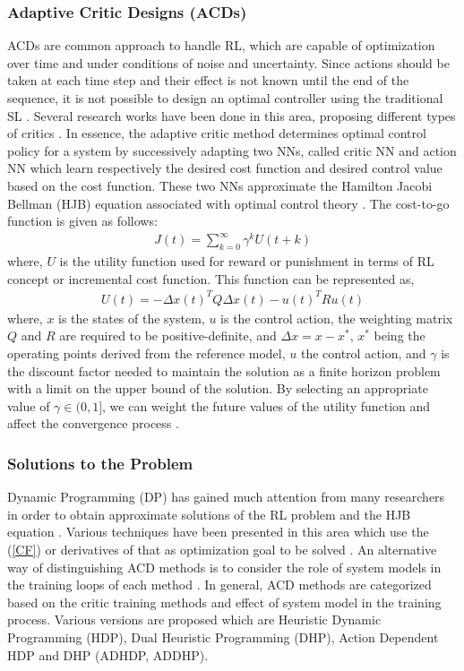 \documentclass[journal]{IEEEtran}
\begin{document}
\subsubsection{Adaptive Critic Designs (ACDs)}
ACDs are common approach to handle RL, which are capable of optimization over time and under conditions of noise and uncertainty. Since actions should be taken at each time step and their effect is not known until the end of the sequence, it is not possible to design an optimal controller using the traditional SL \cite{BlueBook}. Several research works have been done in this area, proposing different types of critics \cite{BlueBook, werbos1992approximate}. In essence, the adaptive critic method determines optimal control policy for a system by successively adapting two NNs, called critic NN and action NN which learn respectively the desired cost function and desired control value based on the cost function. These two NNs approximate the Hamilton Jacobi Bellman (HJB) equation associated with optimal control theory \cite{BlueBook}. The cost-to-go function is given as follows:
\begin{eqnarray}
J(t)=\sum\nolimits_{k=0}^{\infty} \gamma^k U(t+k) \label{CF}
\end{eqnarray}
where, $U$ is the utility function used for reward or punishment in terms of RL concept or incremental cost function. This function can be represented as,
\begin{eqnarray}
U(t)=- \Delta x(t)^T Q \Delta x(t) - u(t)^T R u(t)
\label{U}
\end{eqnarray}
where, $x$ is the states of the system, $u$ is the control action, the weighting matrix $Q$ and $R$ are required to be positive-definite, and $\Delta x=x-x^*$, $x^*$ being the operating points derived from the reference model, $u$ the control action, and $\gamma$ is the discount factor needed to maintain the solution as a finite horizon problem with a limit on the upper bound of the solution. By selecting an appropriate value of $\gamma\in(0, 1]$, we can weight the future values of the utility function and affect the convergence process \cite{Widrow}. 


\subsubsection{Solutions to the Problem}
Dynamic Programming (DP) has gained much attention from many researchers in order to obtain approximate solutions of the RL problem and the HJB equation \cite{Werbos2000a, Wang2009}. Various techniques have been presented in this area which use the (\ref{CF}) or derivatives of that as optimization goal to be solved \cite{WerbosFirst}. An alternative way of distinguishing ACD methods is to consider the role of system models in the training loops of each method \cite{Shannon}. In general, ACD methods are categorized based on the critic training methods and effect of system model in the training process. Various versions are proposed which are Heuristic Dynamic Programming (HDP), Dual Heuristic Programming (DHP), Action Dependent HDP and DHP (ADHDP, ADDHP). 
\end{document}
